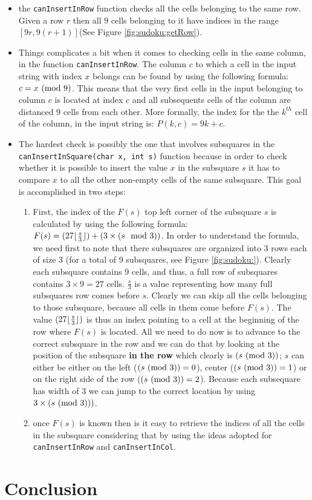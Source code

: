 \begin{itemize}
	\item the \lstinline[columns=fixed]{canInsertInRow} function checks all the cells belonging to
	the same row. Given a row $r$ then all $9$ cells belonging to it have indices in the range
	$[9r,9(r+1)]$(See Figure \ref{fig:sudoku:getRow}).
	\item Things complicates a bit when it comes to checking cells in the same column, in the
	function \lstinline[columns=fixed]{canInsertInRow}. The column $c$ to which a cell in the input
	string with index $x$ belongs can be found by using the following formula: $c = x \ (\mathrm{mod}\ 9)$. This
	means that the very first cells in the input belonging to column $c$ is located at index $c$ and
	all subsequents cells of the column are distanced $9$ cells from each other. More formally, the
	index for the the $k^{th}$ cell of the column, in the input string is: $P(k,c) = 9k+c$.
	\item The hardest check is possibly the one that involves subsquares in the
	\lstinline[columns=fixed]{canInsertInSquare(char x, int s)} function because in order to check
	whether it is possible to insert the value $x$ in the subsquare $s$ it has to compare $x$ to all
	the other non-empty cells of the same subsquare. This goal is accomplished in two steps:
	\begin{enumerate}
		\item First, the index of the $F(s)$ top left corner of the subsquare $s$ is calculated  by
		using the following formula: $F(s) = (27 \lfloor\frac{s}{3}\rfloor) + (3\times (s \mod{3}))$.  In
		order to understand the formula, we need first to note that there subsquares are organized
		into $3$ rows each of size $3$ (for a total of 9 subsquares, see Figure \ref{fig:sudoku:}).
		Clearly each subsquare contains $9$ cells, and thus, a full row of subsquares contains
		$3\times9 =27$ cells. $\frac{s}{3}$ is a value representing how many full subsquares row
		comes before $s$. Clearly we can skip all the cells belonging to those subsquare, because
		all cells in them come before $F(s)$. The value $(27 \lfloor\frac{s}{3}\rfloor)$ is thus an index
		pointing to a cell at the beginning of the row where $F(s)$ is located. All we need to do
		now is to advance to the correct subsquare in the row and we can do that by looking at the
		position of the subsquare \textbf{in the row} which clearly is $(s \ (\mathrm{mod}\ 3))$; $s$ can either
		be either on the left ($(s \ (\mathrm{mod}\ 3))=0$), center ($(s \ (\mathrm{mod}\ 3))=1$) or on the right side of
		the row ($(s \ (\mathrm{mod}\ 3))=2$). Because each subsequare has width of $3$ we can jump to the
		correct location by using $3\times  (s \ (\mathrm{mod}\ 3)))$. 
		\item once $F(s)$ is known then is it easy to retrieve the indices of all the cells in the
		subsquare considering that by using the ideas adopted for
		\lstinline[columns=fixed]{canInsertInRow} and \lstinline[columns=fixed]{canInsertInCol}.
	\end{enumerate}
	
\end{itemize}





\section{Conclusion}



